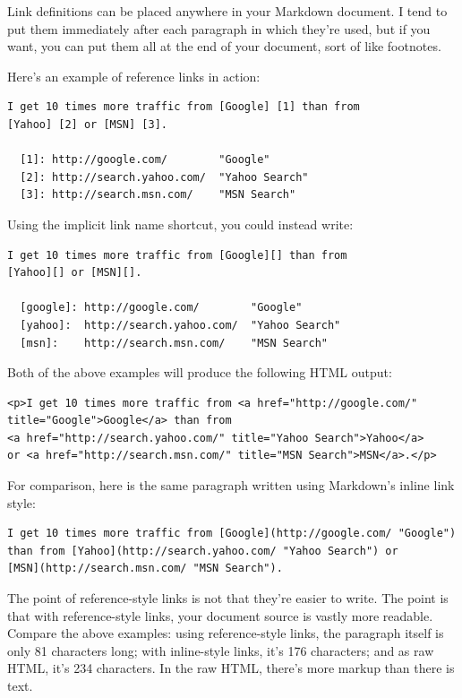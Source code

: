 Link definitions can be placed anywhere in your Markdown document. I
tend to put them immediately after each paragraph in which they're
used, but if you want, you can put them all at the end of your
document, sort of like footnotes.

Here's an example of reference links in action:

\begin{verbatim}
I get 10 times more traffic from [Google] [1] than from
[Yahoo] [2] or [MSN] [3].

  [1]: http://google.com/        "Google"
  [2]: http://search.yahoo.com/  "Yahoo Search"
  [3]: http://search.msn.com/    "MSN Search"
\end{verbatim}

Using the implicit link name shortcut, you could instead write:

\begin{verbatim}
I get 10 times more traffic from [Google][] than from
[Yahoo][] or [MSN][].

  [google]: http://google.com/        "Google"
  [yahoo]:  http://search.yahoo.com/  "Yahoo Search"
  [msn]:    http://search.msn.com/    "MSN Search"
\end{verbatim}

Both of the above examples will produce the following HTML output:

\begin{verbatim}
<p>I get 10 times more traffic from <a href="http://google.com/"
title="Google">Google</a> than from
<a href="http://search.yahoo.com/" title="Yahoo Search">Yahoo</a>
or <a href="http://search.msn.com/" title="MSN Search">MSN</a>.</p>
\end{verbatim}

For comparison, here is the same paragraph written using
Markdown's inline link style:

\begin{verbatim}
I get 10 times more traffic from [Google](http://google.com/ "Google")
than from [Yahoo](http://search.yahoo.com/ "Yahoo Search") or
[MSN](http://search.msn.com/ "MSN Search").
\end{verbatim}

The point of reference-style links is not that they're easier to
write. The point is that with reference-style links, your document
source is vastly more readable. Compare the above examples: using
reference-style links, the paragraph itself is only 81 characters
long; with inline-style links, it's 176 characters; and as raw HTML,
it's 234 characters. In the raw HTML, there's more markup than there
is text.

